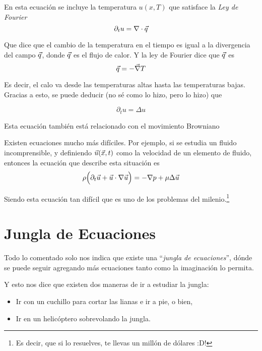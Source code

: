 \begin{example}
En esta ecuación se incluye la temperatura $u(x, T)$ que satisface la \textit{Ley de Fourier}
\begin{equation}
    \partial_t u = \nabla \cdot \vec{q}
\end{equation}

Que dice que el cambio de la temperatura en el tiempo es igual a la divergencia del campo $\vec{q}$, donde $\vec{q}$ es el flujo de calor. Y la ley de Fourier dice que $\vec{q}$ es
\begin{equation}
    \vec{q} = -\vec{\nabla} T
\end{equation}

Es decir, el calo va desde las temperaturas altas hasta las temperaturas bajas. Gracias a esto, se puede deducir (no sé como lo hizo, pero lo hizo) que

\begin{equation}
    \partial_t u = \Delta u
\end{equation}

Esta ecuación también está relacionado con el movimiento Browniano
\end{example}

\begin{example}
Existen ecuaciones mucho más difíciles. Por ejemplo, si se estudia un fluido incomprensible, y definiendo $\vec{u}(\vec{x}, t)$ como la velocidad de un elemento de fluido, entonces la ecuación que describe esta situación es
\begin{equation}
    \rho \Big( \partial_t \vec{u} + \vec{u} \cdot \nabla \vec{u} \Big) = - \nabla p  + \mu \Delta \vec{u}
\end{equation}

Siendo esta ecuación tan difícil que es uno de los problemas del milenio.\footnote{Es decir, que si lo resuelves, te llevas un millón de dólares :D!}
\end{example}

\section{Jungla de Ecuaciones}

Todo lo comentado solo nos indica que existe una ``\textit{jungla de ecuaciones}'', dónde se puede seguir agregando más ecuaciones tanto como la imaginación lo permita.

Y esto nos dice que existen dos maneras de ir a estudiar la jungla: 
\begin{itemize}
    \item Ir con un cuchillo para cortar las lianas e ir a pie, o bien,
    \item Ir en un helicóptero sobrevolando la jungla.
\end{itemize}


